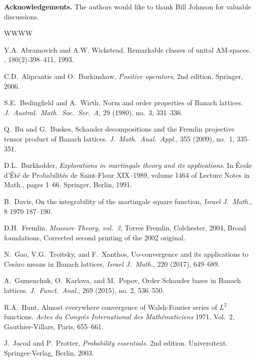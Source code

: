 \documentclass[12pt]{amsart}
\theoremstyle{plain}
\theoremstyle{definition}
\begin{document}
\bigskip


{\bf Acknowledgements.}
The authors would like to thank Bill Johnson for valuable discussions.


\begin{thebibliography}{WWWW}

Y.A. Abramovich and A.W. Wickstead.
\newblock Remarkable classes of unital {AM}-spaces.
, 180(2):398--411, 1993.
  
C.D.~Aliprantis and O.~Burkinshaw,
\emph{Positive operators}, 2nd edition, Springer, 2006.

  S.E.~Bedingfield and A.~Wirth,
  Norm and order properties of Banach lattices.
  \emph{J.\ Austral.\ Math.\ Soc.\ Ser.\ A}, 29 (1980), no.~3, 331--336. 

Q.~Bu and G.~Buskes, Schauder decompositions and the Fremlin
projective tensor product of Banach lattices.
\emph{J.\ Math.\ Anal.\ Appl.}, 355 (2009), no.~1, 335--351. 

D.L.~Burkholder, \emph{Explorations in martingale theory and its applications}.
In \'Ecole d'\'Et\'e de Probabilit\'es de Saint-Flour XIX--1989, volume 1464
of Lecture Notes in Math., pages 1--66. Springer, Berlin, 1991.

B.~Davis, On the integrability of the martingale square function,
\emph{Israel J.\ Math.}, 8 1970 187--190.

D.H.~Fremlin, \textit{Measure Theory, vol.~3}, Torres Fremlin, Colchester, 2004, Broad foundations, Corrected second printing of the 2002 original.

N.~Gao, V.G.~Troitsky, and F.~Xanthos,
Uo-convergence and its applications to Ces\`aro means in Banach lattices,
\emph{Israel J.\ Math.}, 220 (2017), 649--689.

A.~Gumenchuk, O.~Karlova, and M.~Popov,
Order Schauder bases in Banach lattices.
\emph{J.\ Funct.\ Anal.}, 269 (2015), no. 2, 536--550. 

R.A.~Hunt,
Almost everywhere convergence of Walsh-Fourier series of $L^2$
functions.
\emph{Actes du Congr\'es International des Math\'ematiciens}
1971, Vol.~2, Gauthier-Villars, Paris, 655--661.

  J.~Jacod and P.~Protter, \emph{Probability essentials.} 2nd edition.
  Universitext. Springer-Verlag, Berlin, 2003.


\end{thebibliography}
\end{document}
